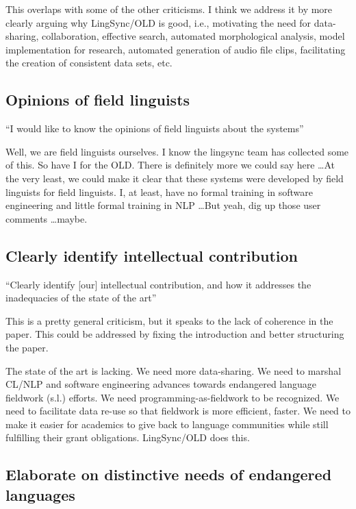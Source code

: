 \documentclass[11pt]{article}
\begin{document}
This overlaps with some of the other criticisms. I think we address it by more
clearly arguing why LingSync/OLD is good, i.e., motivating the need for
data-sharing, collaboration, effective search, automated morphological
analysis, model implementation for research, automated generation of audio file
clips, facilitating the creation of consistent data sets, etc.


\subsection{Opinions of field linguists}

``I would like to know the opinions of field linguists about the systems''

Well, we are field linguists ourselves. I know the lingsync team has collected some of this.
So have I for the OLD. There is definitely more we could say here \ldots At the
very least, we could make it clear that these systems were developed by field
linguists for field linguists. I, at least, have no formal training in software
engineering and little formal training in NLP \ldots But yeah, dig up those user
comments \ldots maybe.



\subsection{Clearly identify intellectual contribution}

``Clearly identify [our] intellectual contribution, and how it addresses the
inadequacies of the state of the art''

This is a pretty general criticism, but it speaks to the lack of coherence in
the paper. This could be addressed by fixing the introduction and better
structuring the paper.

The state of the art is lacking. We need more data-sharing. We need to marshal
CL/NLP and software engineering advances towards endangered language fieldwork
(s.l.) efforts.  We need programming-as-fieldwork to be recognized. We need to
facilitate data re-use so that fieldwork is more efficient, faster. We need to
make it easier for academics to give back to language communities while still
fulfilling their grant obligations. LingSync/OLD does this.


\subsection{Elaborate on distinctive needs of endangered languages}
\end{document}
